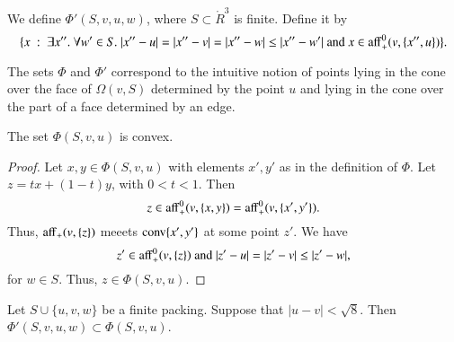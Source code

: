 \begin{tarskidata}
\begin{tarski}
\begin{definition}[$\Phi'$]
We define  $\Phi'(S,v,u,w)$, where $S\subset\ring{R}^3$ is finite.
Define it by
$$
\{x\ :\  \exists x''.\ \forall w'\in S.\ |x''-u|=|x''-v|=|x''-w|\le|x''-w'| \hbox{ and }
   x\in{\operatorname{aff}}_+^0(v,\{x'',u\})\}.
$$
\end{definition}

The sets $\Phi$ and $\Phi'$ 
correspond to the intuitive notion of points lying
in the cone over the face of $\Omega(v,S)$ determined by the point $u$
and lying in the cone over the part of a face determined by an edge.
\end{tarski}

\begin{tarski}
\begin{lemma}
The set $\Phi(S,v,u)$ is convex.
\end{lemma}

\begin{proof}  Let $x,y\in \Phi(S,v,u)$ with elements $x',y'$ as in the definition of $\Phi$.
Let $z = t x + (1-t) y$, with $0<t<1$.  Then 
  $$z\in {\operatorname{aff}}^0_+(v,\{x,y\}) = {\operatorname{aff}}_+^0(v,\{x',y'\}).$$
Thus, ${\operatorname{aff}}_+(v,\{z\})$ meeets ${\operatorname{conv}}\{x',y'\}$ at some point $z'$.  We have
$$
z'\in {\operatorname{aff}}_+^0(v,\{z\}) \hbox{ and } |z'-u|=|z'-v|\le |z'-w|,
$$
for $w\in S$.  Thus, $z\in \Phi(S,v,u)$.
\end{proof}

\end{tarski}

\begin{tarski}
\begin{lemma}
Let $S\cup\{u,v,w\}$ be a finite packing.  Suppose that $|u-v|<\sqrt8$.
Then $\Phi'(S,v,u,w)\subset\Phi(S,v,u)$.
\end{lemma}


\end{tarski}
\end{tarskidata}
